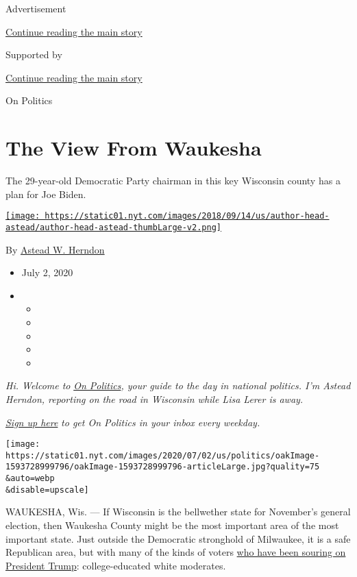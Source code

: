 Advertisement

\protect\hyperlink{after-top}{Continue reading the main story}

Supported by

\protect\hyperlink{after-sponsor}{Continue reading the main story}

On Politics

\hypertarget{the-view-from-waukesha}{%
\section{The View From Waukesha}\label{the-view-from-waukesha}}

The 29-year-old Democratic Party chairman in this key Wisconsin county
has a plan for Joe Biden.

\href{https://www.nytimes.com/by/astead-w-herndon}{\texttt{[image: https://static01.nyt.com/images/2018/09/14/us/author-head-astead/author-head-astead-thumbLarge-v2.png]}}

By \href{https://www.nytimes.com/by/astead-w-herndon}{Astead W. Herndon}

\begin{itemize}
\item
  July 2, 2020
\item
  \begin{itemize}
  \item
  \item
  \item
  \item
  \item
  \end{itemize}
\end{itemize}

\emph{Hi. Welcome to}
\href{https://www.nytimes.com/spotlight/on-politics}{\emph{On
Politics}}\emph{, your guide to the day in national politics. I'm Astead
Herndon, reporting on the road in Wisconsin while Lisa Lerer is away.}

\href{https://www.nytimes.com/newsletters/politics?module=inline}{\emph{Sign
up here}} \emph{to get On Politics in your inbox every weekday.}

\texttt{[image: https://static01.nyt.com/images/2020/07/02/us/politics/oakImage-1593728999796/oakImage-1593728999796-articleLarge.jpg?quality=75\\\&auto=webp\\\&disable=upscale]}

WAUKESHA, Wis. --- If Wisconsin is the bellwether state for November's
general election, then Waukesha County might be the most important area
of the most important state. Just outside the Democratic stronghold of
Milwaukee, it is a safe Republican area, but with many of the kinds of
voters
\href{https://www.nytimes.com/2020/06/25/upshot/poll-2020-biden-battlegrounds.html}{who
have been souring on President Trump}: college-educated white moderates.

